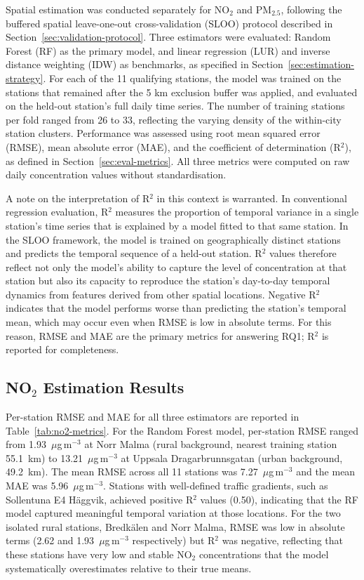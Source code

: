 \documentclass[11pt,a4paper]{article}
\let\oldsubsection\subsection
\renewcommand{\subsection}{\FloatBarrier\oldsubsection}
\begin{document}
Spatial estimation was conducted separately for NO$_2$ and PM$_{2.5}$, following the buffered spatial leave-one-out cross-validation (SLOO) protocol described in Section~\ref{sec:validation-protocol}. Three estimators were evaluated: Random Forest (RF) as the primary model, and linear regression (LUR) and inverse distance weighting (IDW) as benchmarks, as specified in Section~\ref{sec:estimation-strategy}. For each of the 11 qualifying stations, the model was trained on the stations that remained after the 5 km exclusion buffer was applied, and evaluated on the held-out station's full daily time series. The number of training stations per fold ranged from 26 to 33, reflecting the varying density of the within-city station clusters. Performance was assessed using root mean squared error (RMSE), mean absolute error (MAE), and the coefficient of determination (R$^2$), as defined in Section~\ref{sec:eval-metrics}. All three metrics were computed on raw daily concentration values without standardisation.

A note on the interpretation of R$^2$ in this context is warranted. In conventional regression evaluation, R$^2$ measures the proportion of temporal variance in a single station's time series that is explained by a model fitted to that same station. In the SLOO framework, the model is trained on geographically distinct stations and predicts the temporal sequence of a held-out station. R$^2$ values therefore reflect not only the model's ability to capture the level of concentration at that station but also its capacity to reproduce the station's day-to-day temporal dynamics from features derived from other spatial locations. Negative R$^2$ indicates that the model performs worse than predicting the station's temporal mean, which may occur even when RMSE is low in absolute terms. For this reason, RMSE and MAE are the primary metrics for answering RQ1; R$^2$ is reported for completeness.

\subsection{NO\texorpdfstring{$_2$}{2} Estimation Results}
\label{sec:no2-results}

Per-station RMSE and MAE for all three estimators are reported in Table~\ref{tab:no2-metrics}. For the Random Forest model, per-station RMSE ranged from 1.93~$\mu$g\,m$^{-3}$ at Norr Malma (rural background, nearest training station 55.1~km) to 13.21~$\mu$g\,m$^{-3}$ at Uppsala Dragarbrunnsgatan (urban background, 49.2~km). The mean RMSE across all 11 stations was 7.27~$\mu$g\,m$^{-3}$ and the mean MAE was 5.96~$\mu$g\,m$^{-3}$. Stations with well-defined traffic gradients, such as Sollentuna E4 H\"{a}ggvik, achieved positive R$^2$ values (0.50), indicating that the RF model captured meaningful temporal variation at those locations. For the two isolated rural stations, Bredkälen and Norr Malma, RMSE was low in absolute terms (2.62 and 1.93~$\mu$g\,m$^{-3}$ respectively) but R$^2$ was negative, reflecting that these stations have very low and stable NO$_2$ concentrations that the model systematically overestimates relative to their true means.
\end{document}
